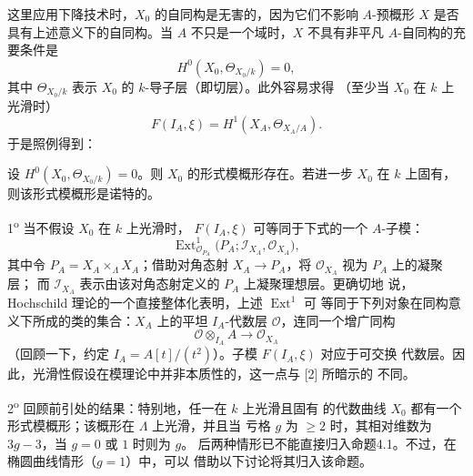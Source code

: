 这里应用下降技术时，$X_0$ 的自同构是无害的，因为它们不影响
$A$-预概形 $X$ 是否具有上述意义下的自同构。当 $A$ 不只是一个域时，$X$
不具有非平凡 $A$-自同构的充要条件是
\[
  H^0(X_0,\Theta_{X_0/k})=0,
\]
其中 $\Theta_{X_0/k}$ 表示 $X_0$ 的 $k$-导子层（即切层）。此外容易求得
（至少当 $X_0$ 在 $k$ 上光滑时）
\[
  F(I_A,\xi)=H^1(X_A,\Theta_{X_A/A}).
\]
于是照例得到：

 设
$H^0(X_0,\Theta_{X_0/k})=0$。则 $X_0$ 的形式模概形存在。若进一步
$X_0$ 在 $k$ 上固有，则该形式模概形是诺特的。

 1\textsuperscript{o} 当不假设 $X_0$ 在 $k$ 上光滑时，
$F(I_A,\xi)$ 可等同于下式的一个 $A$-子模：
\[
  \operatorname{Ext}^1_{\mathcal O_{P_A}}
  \bigl(P_A;\mathcal I_{X_A},\mathcal O_{X_A}\bigr),
\]
其中令 $P_A=X_A\times_\Lambda X_A$；借助对角态射
$X_A\longrightarrow P_A$，将 $\mathcal O_{X_A}$ 视为 $P_A$ 上的凝聚层；
而 $\mathcal I_{X_A}$ 表示由该对角态射定义的 $P_A$ 上凝聚理想层。更确切地
说，Hochschild 理论的一个直接整体化表明，上述 $\operatorname{Ext}^1$ 可
等同于下列对象在同构意义下所成的类的集合：$X_A$ 上的平坦
$I_A$-代数层 $\mathcal O$，连同一个增广同构
\[
  \mathcal O\otimes_{I_A}A\longrightarrow\mathcal O_{X_A}
\]
（回顾一下，约定 $I_A=A[t]/(t^2)$）。子模 $F(I_A,\xi)$ 对应于可交换
代数层。因此，光滑性假设在模理论中并非本质性的，这一点与 [2] 所暗示的
不同。

2\textsuperscript{o} 回顾前引处的结果：特别地，任一在 $k$ 上光滑且固有
的代数曲线 $X_0$ 都有一个形式模概形；该概形在 $\Lambda$ 上光滑，并且当
亏格 $g$ 为 $\geq2$ 时，其相对维数为 $3g-3$，当 $g=0$ 或 $1$ 时则为 $g$。
后两种情形已不能直接归入命题4.1。不过，在椭圆曲线情形（$g=1$）中，可以
借助以下讨论将其归入该命题。


